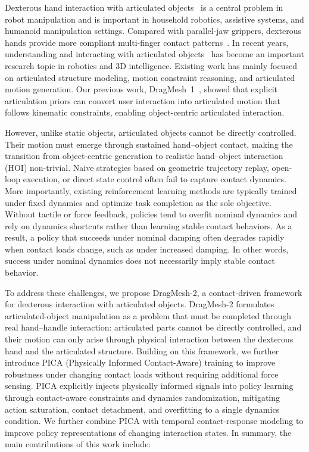 \documentclass{article}
\begin{document}
Dexterous hand interaction with articulated objects~\cite{okami2024,bao2023dexart,jing2025humanoidgen,lu2025h,lee2025stageact,wang2026paws} is a central problem in robot manipulation and is important in household robotics, assistive systems, and humanoid manipulation settings. Compared with parallel-jaw grippers, dexterous hands provide more compliant multi-finger contact patterns~\cite{liu2023dexrepnet,xu2026contact,dexvla2025}. In recent years, understanding and interacting with articulated objects~\cite{gao2025partrm,liu2025building,le2025articulate,wu2026dipo,wang2025adamanip,wu2022vatmart,Wang2025articubot,zhao2025tac} has become an important research topic in robotics and 3D intelligence. Existing work has mainly focused on articulated structure modeling, motion constraint reasoning, and articulated motion generation. Our previous work, DragMesh~1~\cite{zhang2025dragmesh}, showed that explicit articulation priors can convert user interaction into articulated motion that follows kinematic constraints, enabling object-centric articulated interaction.

However, unlike static objects, articulated objects cannot be directly controlled. Their motion must emerge through sustained hand--object contact, making the transition from object-centric generation to realistic hand--object interaction (HOI) non-trivial. Naive strategies based on geometric trajectory replay, open-loop execution, or direct state control often fail to capture contact dynamics. More importantly, existing reinforcement learning methods are typically trained under fixed dynamics and optimize task completion as the sole objective. Without tactile or force feedback, policies tend to overfit nominal dynamics and rely on dynamics shortcuts rather than learning stable contact behaviors. As a result, a policy that succeeds under nominal damping often degrades rapidly when contact loads change, such as under increased damping. In other words, success under nominal dynamics does not necessarily imply stable contact behavior.

To address these challenges, we propose DragMesh-2, a contact-driven framework for dexterous interaction with articulated objects. DragMesh-2 formulates articulated-object manipulation as a problem that must be completed through real hand--handle interaction: articulated parts cannot be directly controlled, and their motion can only arise through physical interaction between the dexterous hand and the articulated structure. Building on this framework, we further introduce PICA (Physically Informed Contact-Aware) training to improve robustness under changing contact loads without requiring additional force sensing. PICA explicitly injects physically informed signals into policy learning through contact-aware constraints and dynamics randomization, mitigating action saturation, contact detachment, and overfitting to a single dynamics condition. We further combine PICA with temporal contact-response modeling to improve policy representations of changing interaction states. In summary, the main contributions of this work include:
\end{document}
